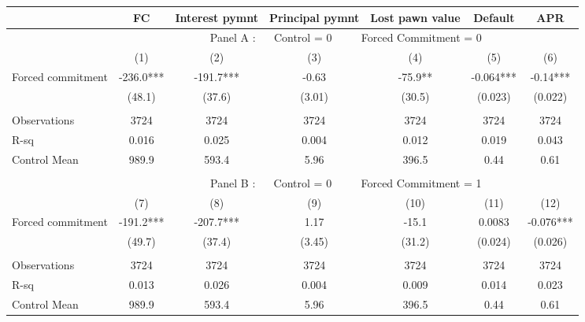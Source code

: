 \begin{tabular}{lcccccc}
\toprule
      & FC    & Interest pymnt & Principal pymnt & Lost pawn value & Default & APR \\
\midrule
      & \multicolumn{6}{c}{Panel A : $\quad$ Control  = 0           $\quad\quad$                  Forced Commitment = 0} \\
\midrule
\midrule
      & (1)   & (2)   & (3)   & (4)   & (5)   & (6) \\
\midrule
\midrule
Forced commitment  & -236.0*** & -191.7*** & -0.63 & -75.9** & -0.064*** & -0.14*** \\
      & (48.1) & (37.6) & (3.01) & (30.5) & (0.023) & (0.022) \\
      &       &       &       &       &       &  \\
\midrule
Observations & 3724  & 3724  & 3724  & 3724  & 3724  & 3724 \\
R-sq  & 0.016 & 0.025 & 0.004 & 0.012 & 0.019 & 0.043 \\
Control Mean & 989.9 & 593.4 & 5.96  & 396.5 & 0.44  & 0.61 \\
\midrule
\midrule
      &       &       &       &       &       &  \\
\midrule
      & \multicolumn{6}{c}{Panel B : $\quad$ Control  = 0         $\quad\quad$                    Forced Commitment = 1} \\
\midrule
\midrule
      & (7)   & (8)   & (9)   & (10)  & (11)  & (12) \\
\midrule
\midrule
Forced commitment  & -191.2*** & -207.7*** & 1.17  & -15.1 & 0.0083 & -0.076*** \\
      & (49.7) & (37.4) & (3.45) & (31.2) & (0.024) & (0.026) \\
      &       &       &       &       &       &  \\
\midrule
Observations & 3724  & 3724  & 3724  & 3724  & 3724  & 3724 \\
R-sq  & 0.013 & 0.026 & 0.004 & 0.009 & 0.014 & 0.023 \\
Control Mean & 989.9 & 593.4 & 5.96  & 396.5 & 0.44  & 0.61 \\
\bottomrule
\bottomrule
\end{tabular}%
